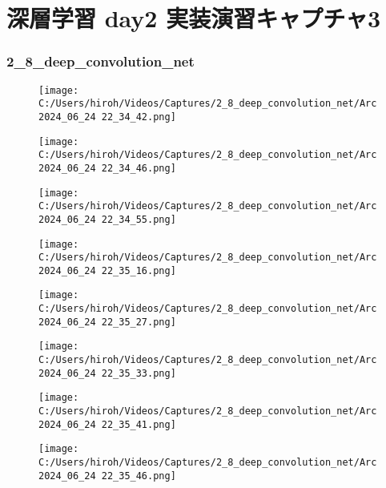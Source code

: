 \documentclass{ltjsarticle}
\begin{document}
\part*{深層学習 day2 実装演習キャプチャ3}
\section{2\_8\_deep\_convolution\_net}
\begin{figure}[htbp]
  \centering
  \texttt{[image: C:/Users/hiroh/Videos/Captures/2\_8\_deep\_convolution\_net/Arc 2024\_06\_24 22\_34\_42.png]}
\end{figure}
\begin{figure}[htbp]
  \centering
  \texttt{[image: C:/Users/hiroh/Videos/Captures/2\_8\_deep\_convolution\_net/Arc 2024\_06\_24 22\_34\_46.png]}
\end{figure}
\begin{figure}[htbp]
  \centering
  \texttt{[image: C:/Users/hiroh/Videos/Captures/2\_8\_deep\_convolution\_net/Arc 2024\_06\_24 22\_34\_55.png]}
\end{figure}
\begin{figure}[htbp]
  \centering
  \texttt{[image: C:/Users/hiroh/Videos/Captures/2\_8\_deep\_convolution\_net/Arc 2024\_06\_24 22\_35\_16.png]}
\end{figure}
\begin{figure}[htbp]
  \centering
  \texttt{[image: C:/Users/hiroh/Videos/Captures/2\_8\_deep\_convolution\_net/Arc 2024\_06\_24 22\_35\_27.png]}
\end{figure}
\begin{figure}[htbp]
  \centering
  \texttt{[image: C:/Users/hiroh/Videos/Captures/2\_8\_deep\_convolution\_net/Arc 2024\_06\_24 22\_35\_33.png]}
\end{figure}
\begin{figure}[htbp]
  \centering
  \texttt{[image: C:/Users/hiroh/Videos/Captures/2\_8\_deep\_convolution\_net/Arc 2024\_06\_24 22\_35\_41.png]}
\end{figure}
\begin{figure}[htbp]
  \centering
  \texttt{[image: C:/Users/hiroh/Videos/Captures/2\_8\_deep\_convolution\_net/Arc 2024\_06\_24 22\_35\_46.png]}
\end{figure}

\clearpage
\end{document}
